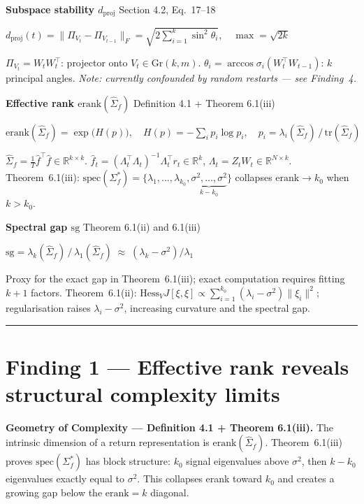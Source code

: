 \documentclass[11pt,a4paper]{article}
\begin{document}
\medskip
\textbf{Subspace stability $d_{\mathrm{proj}}$} \hfill{\small Section 4.2, Eq.~17--18}
\begin{formulabox}
$d_{\mathrm{proj}}(t) = \|\Pi_{V_t} - \Pi_{V_{t-1}}\|_F
= \sqrt{2\sum_{i=1}^k \sin^2\theta_i},
\quad \max = \sqrt{2k}$
\end{formulabox}
{\small\color{cgray}
$\Pi_{V_t}=W_tW_t^\top$: projector onto $V_t\in\mathrm{Gr}(k,m)$.
$\theta_i = \arccos\sigma_i(W_t^\top W_{t-1})$: $k$ principal angles.
\emph{Note: currently confounded by random restarts — see Finding~4.}}

\medskip
\textbf{Effective rank $\mathrm{erank}(\hat{\Sigma}_f)$} \hfill{\small Definition 4.1 + Theorem 6.1(iii)}
\begin{formulabox}
$\mathrm{erank}(\hat{\Sigma}_f) = \exp\!\bigl(H(p)\bigr),\quad
H(p) = -\sum_i p_i\log p_i,\quad
p_i = \lambda_i(\hat{\Sigma}_f)\,/\,\mathrm{tr}(\hat{\Sigma}_f)$
\end{formulabox}
{\small\color{cgray}
$\hat{\Sigma}_f = \tfrac{1}{T}\hat{f}^\top\hat{f} \in \mathbb{R}^{k\times k}$.
$\hat{f}_t = (\Lambda_t^\top\Lambda_t)^{-1}\Lambda_t^\top r_t \in \mathbb{R}^k$,
$\Lambda_t = Z_t W_t \in \mathbb{R}^{N\times k}$.
Theorem~6.1(iii): $\mathrm{spec}(\Sigma^*_f)=\{\lambda_1,\ldots,\lambda_{k_0},
\underbrace{\sigma^2,\ldots,\sigma^2}_{k-k_0}\}$ collapses $\mathrm{erank}\to k_0$ when $k>k_0$.}

\medskip
\textbf{Spectral gap $\mathrm{sg}$} \hfill{\small Theorem 6.1(ii) and 6.1(iii)}
\begin{formulabox}
$\mathrm{sg} = \lambda_k(\hat{\Sigma}_f)\,/\,\lambda_1(\hat{\Sigma}_f)
\;\approx\; (\lambda_k - \sigma^2)/\lambda_1$
\end{formulabox}
{\small\color{cgray}
Proxy for the exact gap in Theorem~6.1(iii); exact computation requires fitting $k+1$ factors.
Theorem~6.1(ii): $\mathrm{Hess}_V J[\xi,\xi] \propto \sum_{i=1}^{k_0}(\lambda_i-\sigma^2)\|\xi_i\|^2$;
regularisation raises $\lambda_i-\sigma^2$, increasing curvature and the spectral gap.}

\noindent\rule{\textwidth}{0.4pt}

\section*{Finding 1 — Effective rank reveals structural complexity limits}

\begin{annblue}
\small\textbf{Geometry of Complexity — Definition 4.1 + Theorem 6.1(iii).}
The intrinsic dimension of a return representation is $\mathrm{erank}(\hat\Sigma_f)$.
Theorem~6.1(iii) proves $\mathrm{spec}(\Sigma^*_f)$ has block structure:
$k_0$ signal eigenvalues above $\sigma^2$, then $k-k_0$ eigenvalues exactly equal to $\sigma^2$.
This collapses erank toward $k_0$ and creates a growing gap below the $\mathrm{erank}=k$ diagonal.
\end{annblue}
\end{document}
